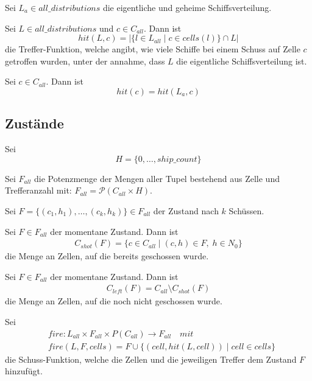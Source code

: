 \documentclass[a4paper,12pt]{llncs}
\numberwithin{equation}{section}
\begin{document}
\begin{definition}
Sei $L_a \in all\_distributions$ die eigentliche und geheime Schiffsverteilung.
\end{definition}

\begin{definition}
Sei $L \in all\_distributions$ und $c \in C_{all}$.
Dann ist 
\[
hit(L, c)=|\{l \in L_{all} \mid c \in cells(l)\} \cap L|
\]
die Treffer-Funktion, welche angibt, wie viele Schiffe bei einem Schuss auf Zelle $c$ getroffen wurden, unter der annahme, dass $L$ die eigentliche Schiffsverteilung ist.
\end{definition}

\begin{definition}
Sei $c \in C_{all}$.
Dann ist 
\[
hit(c)=hit(L_a, c)
\]
\end{definition}

\subsection{Zustände}

Sei
\[
H=\{0, \dots, ship\_count\}
\]

\begin{definition}
Sei $F_{all}$ die Potenzmenge der Mengen aller Tupel bestehend aus Zelle und Trefferanzahl mit:
$F_{all}=\mathscr{P}(C_{all}\times H)$.
\end{definition}

\begin{definition}
Sei $F=\{(c_1, h_1), \dots , (c_k, h_k)\}\in F_{all}$ der Zustand nach $k$ Schüssen.
\end{definition}

\begin{definition}
Sei $F\in F_{all}$ der momentane Zustand.
Dann ist
\begin{align}
C_{shot}(F)=\{c \in C_{all} \mid (c,h) \in F, \; h \in N_0\}
\end{align}
 die Menge an Zellen, auf die bereits geschossen wurde.
\end{definition}

\begin{definition}
Sei $F\in F_{all}$ der momentane Zustand.
Dann ist 
\begin{align}
C_{left}(F)=C_{all} \setminus C_{shot}(F)
\end{align}
die Menge an Zellen, auf die noch nicht geschossen wurde.
\end{definition}

\begin{definition}
Sei
\begin{align}
&fire:L_{all}\times F_{all}\times P(C_{all}) \rightarrow F_{all} \quad mit \nonumber\\
&fire(L, F, cells)=F \cup \{(cell,hit(L, cell)) \mid cell \in cells\}  \nonumber
\end{align}
die Schuss-Funktion, welche die Zellen und die jeweiligen Treffer dem Zustand $F$ hinzufügt.
\end{definition}
\end{document}
